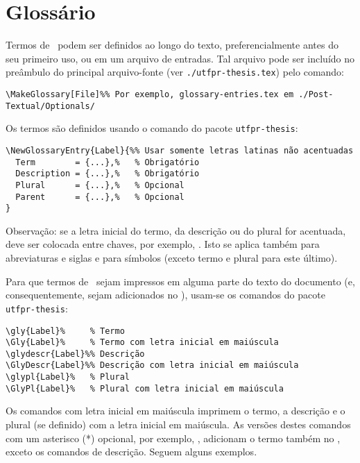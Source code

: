 \section{Glossário}%
\label{sect:gly}

Termos de \glyref\ podem ser definidos ao longo do texto, preferencialmente antes do seu primeiro uso, ou em um arquivo de entradas.
Tal arquivo pode ser incluído no preâmbulo do principal arquivo-fonte (ver \texttt{./utfpr-thesis.tex}) pelo comando:

\begin{snugshade}
\begin{Verbatim}
\MakeGlossary[File]%% Por exemplo, glossary-entries.tex em ./Post-Textual/Optionals/
\end{Verbatim}
\end{snugshade}

Os termos são definidos usando o comando do pacote \texttt{utfpr-thesis}:

\begin{snugshade}
\begin{Verbatim}
\NewGlossaryEntry{Label}{%% Usar somente letras latinas não acentuadas
  Term        = {...},%   % Obrigatório
  Description = {...},%   % Obrigatório
  Plural      = {...},%   % Opcional
  Parent      = {...},%   % Opcional
}
\end{Verbatim}
\end{snugshade}

\noindent Observação: se a letra inicial do termo, da descrição ou do plural for acentuada, deve ser colocada entre chaves, por exemplo, .
Isto se aplica também para abreviaturas e siglas e para símbolos (exceto termo e plural para este último).

Para que termos de \glyref\ sejam impressos em alguma parte do texto do documento (e, consequentemente, sejam adicionados no \glyref), usam-se os comandos do pacote \texttt{utfpr-thesis}:

\begin{snugshade}
\begin{Verbatim}
\gly{Label}%     % Termo
\Gly{Label}%     % Termo com letra inicial em maiúscula
\glydescr{Label}%% Descrição
\GlyDescr{Label}%% Descrição com letra inicial em maiúscula
\glypl{Label}%   % Plural
\GlyPl{Label}%   % Plural com letra inicial em maiúscula
\end{Verbatim}
\end{snugshade}

\noindent Os comandos com letra inicial em maiúscula imprimem o termo, a descrição e o plural (se definido) com a letra inicial em maiúscula.
As versões destes comandos com um asterisco (*) opcional, por exemplo, , adicionam o termo também no \idxref, exceto os comandos de descrição.
Seguem alguns exemplos.

